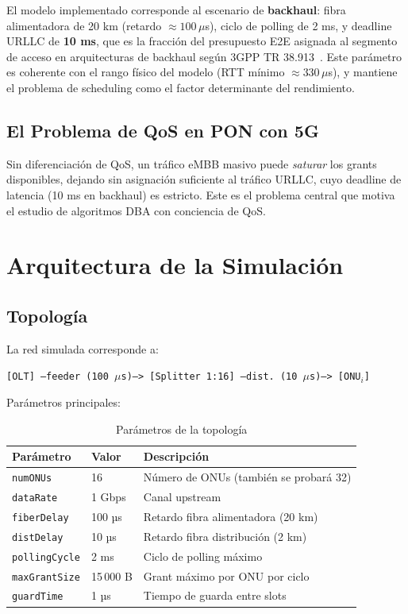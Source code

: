 \documentclass[12pt, letterpaper]{article}
\begin{document}
El modelo implementado corresponde al escenario de \textbf{backhaul}: fibra alimentadora de 20 km (retardo $\approx 100\,\mu$s), ciclo de polling de 2 ms, y deadline URLLC de \textbf{10 ms}, que es la fracción del presupuesto E2E asignada al segmento de acceso en arquitecturas de backhaul según 3GPP TR 38.913~\cite{3gpp5g}. Este parámetro es coherente con el rango físico del modelo (RTT mínimo $\approx 330\,\mu$s), y mantiene el problema de scheduling como el factor determinante del rendimiento.

\subsection{El Problema de QoS en PON con 5G}

Sin diferenciación de QoS, un tráfico eMBB masivo puede \textit{saturar} los grants disponibles, dejando sin asignación suficiente al tráfico URLLC, cuyo deadline de latencia (10 ms en backhaul) es estricto. Este es el problema central que motiva el estudio de algoritmos DBA con conciencia de QoS.

\section{Arquitectura de la Simulación}

\subsection{Topología}

La red simulada corresponde a:

\begin{center}
\texttt{[OLT] ---feeder (100\,$\mu$s)---> [Splitter 1:16] ---dist. (10\,$\mu$s)---> [ONU$_i$]}
\end{center}

Parámetros principales:

\begin{table}[H]
\centering
\caption{Parámetros de la topología}
\begin{tabular}{lll}
\toprule
\textbf{Parámetro} & \textbf{Valor} & \textbf{Descripción} \\
\midrule
\texttt{numONUs}      & 16         & Número de ONUs (también se probará 32) \\
\texttt{dataRate}     & 1 Gbps     & Canal upstream \\
\texttt{fiberDelay}   & 100 µs     & Retardo fibra alimentadora (20 km) \\
\texttt{distDelay}    & 10 µs      & Retardo fibra distribución (2 km) \\
\texttt{pollingCycle} & 2 ms       & Ciclo de polling máximo \\
\texttt{maxGrantSize} & 15\,000 B  & Grant máximo por ONU por ciclo \\
\texttt{guardTime}    & 1 µs       & Tiempo de guarda entre slots \\
\bottomrule
\end{tabular}
\end{table}
\end{document}
